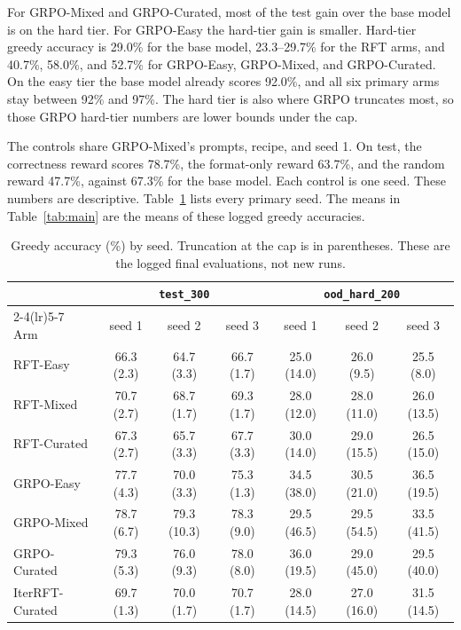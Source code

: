 For GRPO-Mixed and GRPO-Curated, most of the test gain over the base model is on the hard tier. For GRPO-Easy the hard-tier gain is smaller. Hard-tier greedy accuracy is 29.0\% for the base model, 23.3--29.7\% for the RFT arms, and 40.7\%, 58.0\%, and 52.7\% for GRPO-Easy, GRPO-Mixed, and GRPO-Curated. On the easy tier the base model already scores 92.0\%, and all six primary arms stay between 92\% and 97\%. The hard tier is also where GRPO truncates most, so those GRPO hard-tier numbers are lower bounds under the cap.

The controls share GRPO-Mixed's prompts, recipe, and seed 1. On test, the correctness reward scores 78.7\%, the format-only reward 63.7\%, and the random reward 47.7\%, against 67.3\% for the base model. Each control is one seed. These numbers are descriptive. Table~\ref{tab:seeds} lists every primary seed. The means in Table~\ref{tab:main} are the means of these logged greedy accuracies.

\begin{table}[t]
\centering
{\small
\begin{tabular}{lcccccc}
\toprule
 & \multicolumn{3}{c}{\texttt{test\_300}} & \multicolumn{3}{c}{\texttt{ood\_hard\_200}} \\
\cmidrule(lr){2-4}\cmidrule(lr){5-7}
Arm & seed 1 & seed 2 & seed 3 & seed 1 & seed 2 & seed 3 \\
\midrule
RFT-Easy & 66.3 (2.3) & 64.7 (3.3) & 66.7 (1.7) & 25.0 (14.0) & 26.0 (9.5) & 25.5 (8.0) \\
RFT-Mixed & 70.7 (2.7) & 68.7 (1.7) & 69.3 (1.7) & 28.0 (12.0) & 28.0 (11.0) & 26.0 (13.5) \\
RFT-Curated & 67.3 (2.7) & 65.7 (3.3) & 67.7 (3.3) & 30.0 (14.0) & 29.0 (15.5) & 26.5 (15.0) \\
GRPO-Easy & 77.7 (4.3) & 70.0 (3.3) & 75.3 (1.3) & 34.5 (38.0) & 30.5 (21.0) & 36.5 (19.5) \\
GRPO-Mixed & 78.7 (6.7) & 79.3 (10.3) & 78.3 (9.0) & 29.5 (46.5) & 29.5 (54.5) & 33.5 (41.5) \\
GRPO-Curated & 79.3 (5.3) & 76.0 (9.3) & 78.0 (8.0) & 36.0 (19.5) & 29.0 (45.0) & 29.5 (40.0) \\
IterRFT-Curated & 69.7 (1.3) & 70.0 (1.7) & 70.7 (1.7) & 28.0 (14.5) & 27.0 (16.0) & 31.5 (14.5) \\
\bottomrule
\end{tabular}
}
\caption{Greedy accuracy (\%) by seed. Truncation at the cap is in parentheses. These are the logged final evaluations, not new runs.}
\label{tab:seeds}
\end{table}

